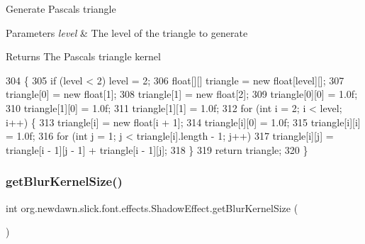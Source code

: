 Generate Pascal\textquotesingle{}s triangle


\begin{DoxyParams}{Parameters}
{\em level} & The level of the triangle to generate \\
\hline
\end{DoxyParams}
\begin{DoxyReturn}{Returns}
The Pascal\textquotesingle{}s triangle kernel 
\end{DoxyReturn}

\begin{DoxyCode}
304                                                                 \{
305         \textcolor{keywordflow}{if} (level < 2) level = 2;
306         \textcolor{keywordtype}{float}[][] triangle = \textcolor{keyword}{new} \textcolor{keywordtype}{float}[level][];
307         triangle[0] = \textcolor{keyword}{new} \textcolor{keywordtype}{float}[1];
308         triangle[1] = \textcolor{keyword}{new} \textcolor{keywordtype}{float}[2];
309         triangle[0][0] = 1.0f;
310         triangle[1][0] = 1.0f;
311         triangle[1][1] = 1.0f;
312         \textcolor{keywordflow}{for} (\textcolor{keywordtype}{int} i = 2; i < level; i++) \{
313             triangle[i] = \textcolor{keyword}{new} \textcolor{keywordtype}{float}[i + 1];
314             triangle[i][0] = 1.0f;
315             triangle[i][i] = 1.0f;
316             \textcolor{keywordflow}{for} (\textcolor{keywordtype}{int} j = 1; j < triangle[i].length - 1; j++)
317                 triangle[i][j] = triangle[i - 1][j - 1] + triangle[i - 1][j];
318         \}
319         \textcolor{keywordflow}{return} triangle;
320     \}
\end{DoxyCode}
\mbox{\label{classorg_1_1newdawn_1_1slick_1_1font_1_1effects_1_1_shadow_effect_aa9e2dbafd2b65a74b9175badfca0ac70}} 
\subsubsection{\texorpdfstring{get\+Blur\+Kernel\+Size()}{getBlurKernelSize()}}
{\footnotesize\ttfamily int org.\+newdawn.\+slick.\+font.\+effects.\+Shadow\+Effect.\+get\+Blur\+Kernel\+Size (\begin{DoxyParamCaption}{ }\end{DoxyParamCaption})\hspace{0.3cm}{\ttfamily [inline]}}

